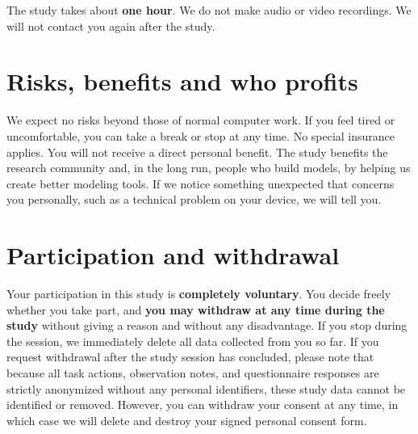 The study takes about \textbf{one hour}. We do not make audio or video recordings. We will not contact you again after the study.

\section{Risks, benefits and who profits}
We expect no risks beyond those of normal computer work. If you feel tired or uncomfortable, you can take a break or stop at any time. No special insurance applies. You will not receive a direct personal benefit. The study benefits the research community and, in the long run, people who build models, by helping us create better modeling tools. If we notice something unexpected that concerns you personally, such as a technical problem on your device, we will tell you.

\section{Participation and withdrawal}
Your participation in this study is \textbf{completely voluntary}. You decide freely whether you take part, and \textbf{you may withdraw at any time during the study} without giving a reason and without any disadvantage. If you stop during the session, we immediately delete all data collected from you so far. If you request withdrawal after the study session has concluded, please note that because all task actions, observation notes, and questionnaire responses are strictly anonymized without any personal identifiers, these study data cannot be identified or removed. However, you can withdraw your consent at any time, in which case we will delete and destroy your signed personal consent form.

